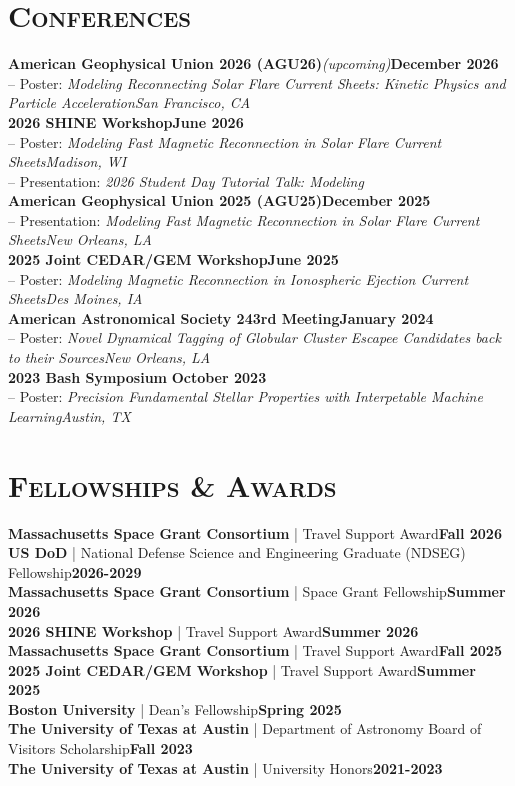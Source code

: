 \documentclass[11pt]{article}
\begin{document}
\section{\textsc{Conferences}}
\small
\textbf{American Geophysical Union 2026 (AGU26)}\textit{(upcoming)}\hfill\textbf{December 2026}
\\ -- Poster: \textit{Modeling Reconnecting Solar Flare Current Sheets: Kinetic Physics and Particle Acceleration\hfill San Francisco, CA}
\\\textbf{2026 SHINE Workshop}\hfill\textbf{June 2026}
\\ -- Poster: \textit{Modeling Fast Magnetic Reconnection in Solar Flare Current Sheets\hfill Madison, WI}
\\ -- Presentation: \textit{2026 Student Day Tutorial Talk: Modeling}
\\\textbf{American Geophysical Union 2025 (AGU25)}\hfill\textbf{December 2025}
\\ -- Presentation: \textit{Modeling Fast Magnetic Reconnection in Solar Flare Current Sheets\hfill New Orleans, LA}
\\\textbf{2025 Joint CEDAR/GEM Workshop}\hfill\textbf{June 2025}
\\ -- Poster: \textit{Modeling Magnetic Reconnection in Ionospheric Ejection Current Sheets\hfill Des Moines, IA}
\\\textbf{American Astronomical Society 243rd Meeting}\hfill\textbf{January 2024}
\\ -- Poster: \textit{Novel Dynamical Tagging of Globular Cluster Escapee Candidates back to their Sources\hfill New Orleans, LA}
\\\textbf{2023 Bash Symposium} \hfill\textbf{October 2023}
\\ -- Poster: \textit{Precision Fundamental Stellar Properties with Interpetable Machine Learning\hfill Austin, TX}

\section{\textsc{Fellowships \& Awards}}
\textbf{Massachusetts Space Grant Consortium} | Travel Support Award\hfill\textbf{Fall 2026} \\
\textbf{US DoD} | National Defense Science and Engineering Graduate (NDSEG) Fellowship\hfill\textbf{2026-2029} \\
\textbf{Massachusetts Space Grant Consortium} | Space Grant Fellowship\hfill\textbf{Summer 2026} \\
\textbf{2026 SHINE Workshop} | Travel Support Award\hfill\textbf{Summer 2026} \\
\textbf{Massachusetts Space Grant Consortium} | Travel Support Award\hfill\textbf{Fall 2025} \\
\textbf{2025 Joint CEDAR/GEM Workshop} | Travel Support Award\hfill\textbf{Summer 2025} \\
\textbf{Boston University} | Dean's Fellowship\hfill\textbf{Spring 2025} \\
\textbf{The University of Texas at Austin} | Department of Astronomy Board of Visitors Scholarship\hfill\textbf{Fall 2023} \\
\textbf{The University of Texas at Austin} | University Honors\hfill\textbf{2021-2023}
\end{document}
